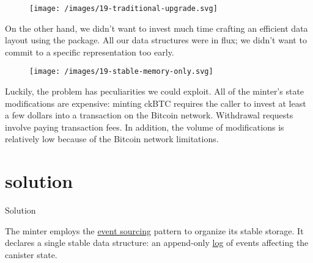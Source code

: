 \documentclass{article}
\begin{document}
\begin{figure}[grayscale-diagram]
  \texttt{[image: /images/19-traditional-upgrade.svg]}
\end{figure}

  On the other hand, we didn't want to invest much time crafting an efficient data layout using the \href{/posts/14-stable-structures.html}{} package.
  All our data structures were in flux; we didn't want to commit to a specific representation too early.

\begin{figure}[grayscale-diagram]
  \texttt{[image: /images/19-stable-memory-only.svg]}
\end{figure}

Luckily, the problem has peculiarities we could exploit.
All of the minter's state modifications are expensive: minting ckBTC requires the caller to invest at least a few dollars into a transaction on the Bitcoin network.
Withdrawal requests involve paying transaction fees.
In addition, the volume of modifications is relatively low because of the Bitcoin network limitations.

\section{solution}{Solution}

The minter employs the \href{https://learn.microsoft.com/en-us/azure/architecture/patterns/event-sourcing}{event sourcing} pattern to organize its stable storage.
It declares a single stable data structure: an append-only \href{https://sourcegraph.com/github.com/dfinity/ic@5c0af72426c7eca863201c4853cb18dab504a140/-/blob/rs/bitcoin/ckbtc/minter/src/storage.rs?L21}{log} of events affecting the canister state.
\end{document}
